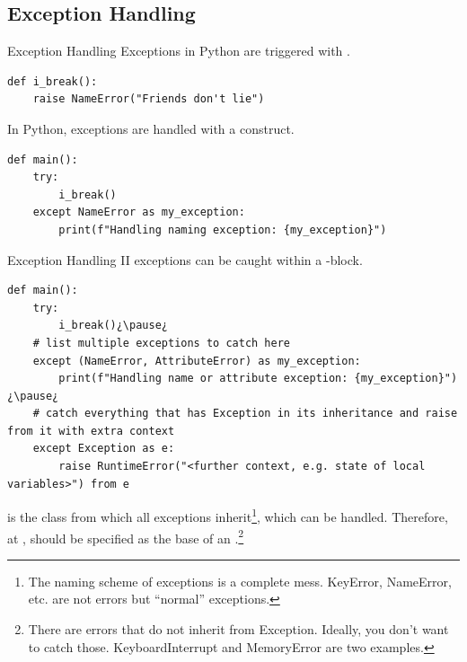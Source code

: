 \documentclass[12pt, aspectratio=169, usepdftitle=false]{beamer}
\newcommand{\pp}[1]{\lpl{#1}}
\begin{document}
\subsection{Exception Handling}

\begin{frame}[fragile]{Exception Handling}
  Exceptions in Python are triggered with . 
  \begin{lstlisting}[language=pytiny]
def i_break():
    raise NameError("Friends don't lie")
  \end{lstlisting}
  \pause

  In Python, exceptions are handled with a  construct. 
  \begin{lstlisting}[language=pytiny]
def main():
    try:
        i_break()
    except NameError as my_exception:
        print(f"Handling naming exception: {my_exception}")
  \end{lstlisting}
\end{frame}
	


\begin{frame}[fragile]{Exception Handling II}
	 exceptions can be caught within a \pp{try}-block.
	\begin{lstlisting}[language=pytiny]
def main():
    try:
        i_break()¿\pause¿
    # list multiple exceptions to catch here 
    except (NameError, AttributeError) as my_exception:
        print(f"Handling name or attribute exception: {my_exception}")¿\pause¿
    # catch everything that has Exception in its inheritance and raise from it with extra context
    except Exception as e:
        raise RuntimeError("<further context, e.g. state of local variables>") from e
	\end{lstlisting}
	\pause
	\pp{Exception} is the class from which all exceptions inherit\footnote{The naming scheme of exceptions is a complete mess. KeyError, NameError, etc. are not errors but “normal” exceptions.}, which can  be handled.
	\newline\pause
	Therefore, at , \pp{Exception} should be specified as the base of an \pp{except}.\footnote{There are errors that do not inherit from Exception. Ideally, you don’t want to catch those. KeyboardInterrupt and MemoryError are two examples.}

\end{frame}
\end{document}
